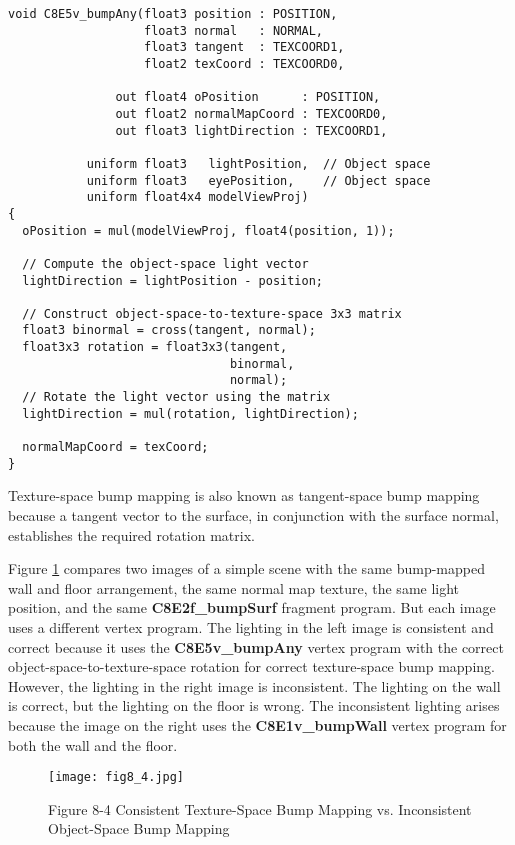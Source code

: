 \documentclass[../main.tex]{subfiles}
\begin{document}
\FloatBarrier
\begin{lstlisting}[caption=Example 8-5. The \textbf{C8E5v_bumpAny} Vertex Program]
void C8E5v_bumpAny(float3 position : POSITION,
                   float3 normal   : NORMAL,
                   float3 tangent  : TEXCOORD1,
                   float2 texCoord : TEXCOORD0,

               out float4 oPosition      : POSITION,
               out float2 normalMapCoord : TEXCOORD0,
               out float3 lightDirection : TEXCOORD1,

           uniform float3   lightPosition,  // Object space
           uniform float3   eyePosition,    // Object space
           uniform float4x4 modelViewProj)
{
  oPosition = mul(modelViewProj, float4(position, 1));

  // Compute the object-space light vector
  lightDirection = lightPosition - position;

  // Construct object-space-to-texture-space 3x3 matrix
  float3 binormal = cross(tangent, normal);
  float3x3 rotation = float3x3(tangent,
                               binormal,
                               normal);
  // Rotate the light vector using the matrix
  lightDirection = mul(rotation, lightDirection);

  normalMapCoord = texCoord;
}
\end{lstlisting}
\FloatBarrier

Texture-space bump mapping is also known as tangent-space bump mapping because a tangent vector to the surface, in conjunction with the surface normal, establishes the required rotation matrix.

Figure \ref{fig:8-4} compares two images of a simple scene with the same bump-mapped wall and floor arrangement, the same normal map texture, the same light position, and the same \textbf{C8E2f_bumpSurf} fragment program. But each image uses a different vertex program. The lighting in the left image is consistent and correct because it uses the \textbf{C8E5v_bumpAny} vertex program with the correct object-space-to-texture-space rotation for correct texture-space bump mapping. However, the lighting in the right image is inconsistent. The lighting on the wall is correct, but the lighting on the floor is wrong. The inconsistent lighting arises because the image on the right uses the \textbf{C8E1v_bumpWall} vertex program for both the wall and the floor.

\begin{figure}
    \centering
    \texttt{[image: fig8\_4.jpg]}
    \caption{Figure 8-4 Consistent Texture-Space Bump Mapping vs. Inconsistent Object-Space Bump Mapping}
    \label{fig:8-4}
\end{figure}
\end{document}
